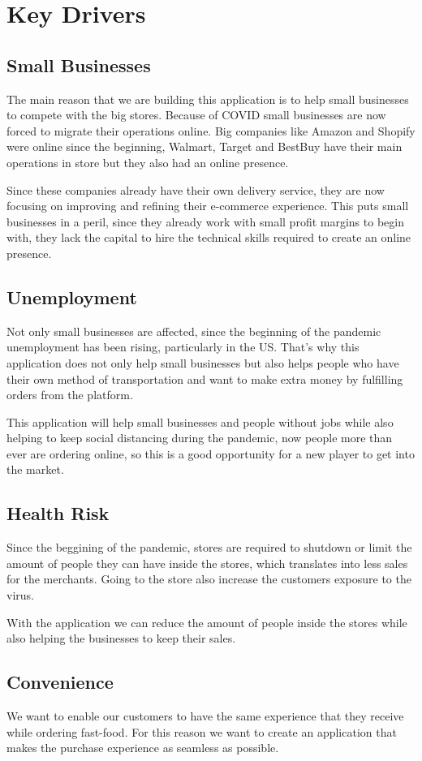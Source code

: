 \section{Key Drivers}
\subsection{Small Businesses}
The main reason that we are building this application is to help small 
businesses to compete with the big stores. Because of COVID small businesses 
are now forced to migrate their operations online. Big companies like Amazon 
and Shopify were online since the beginning, Walmart, Target and BestBuy 
have their main operations in store but they also had an online 
presence. \newline

\noindent Since these companies already have their own delivery service, 
they are now focusing on improving and refining their e-commerce experience. 
This puts small businesses in a peril, since they already work with small 
profit margins to begin with, they lack the capital to hire the technical 
skills required to create an online presence. \newline

\subsection{Unemployment}
\noindent Not only small businesses are affected, since the beginning of 
the pandemic unemployment has been rising, particularly in the US. That’s why 
this application does not only help small businesses but also helps people 
who have their own method of transportation and want to make extra money 
by fulfilling orders from the platform.\newline

\noindent This application will help small businesses and people without jobs 
while also helping to keep social distancing during the pandemic, 
now people more than ever are ordering online, so this is a good opportunity 
for a new player to get into the market.

\subsection{Health Risk}
\noindent Since the beggining of the pandemic, stores are required to shutdown 
or limit the amount of people they can have inside the stores, which translates 
into less sales for the merchants. Going to the store also increase the 
customers exposure to the virus. \newline

\noindent With the application we can reduce the amount of people inside the 
stores while also helping the businesses to keep their sales.

\pagebreak

\subsection{Convenience}
\noindent We want to enable our customers to have the same experience that 
they receive while ordering fast-food. For this reason we want to create 
an application that makes the purchase experience as seamless as possible.